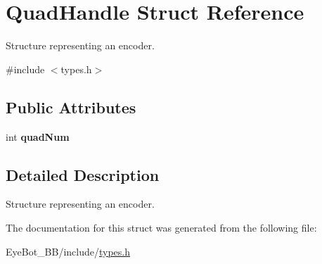\hypertarget{struct_quad_handle}{\section{\-Quad\-Handle \-Struct \-Reference}
\label{struct_quad_handle}
}


\-Structure representing an encoder.  




{\ttfamily \#include $<$types.\-h$>$}

\subsection*{\-Public \-Attributes}
\begin{DoxyCompactItemize}
\item 
\hypertarget{struct_quad_handle_a9eebb745ca1a05b8796f5b2fcab28339}{int {\bfseries quad\-Num}}\label{struct_quad_handle_a9eebb745ca1a05b8796f5b2fcab28339}

\end{DoxyCompactItemize}


\subsection{\-Detailed \-Description}
\-Structure representing an encoder. 

\-The documentation for this struct was generated from the following file\-:\begin{DoxyCompactItemize}
\item 
\-Eye\-Bot\-\_\-\-B\-B/include/\hyperlink{types_8h}{types.\-h}\end{DoxyCompactItemize}
